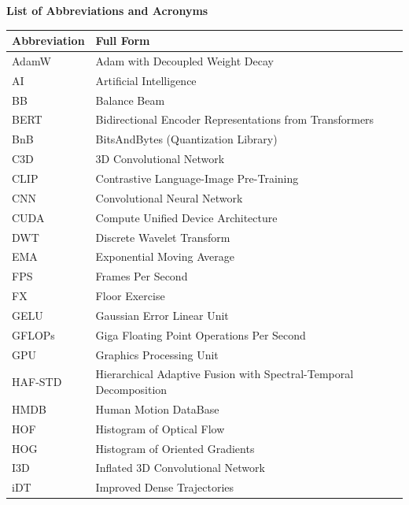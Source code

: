 
\newpage
{}
{}

\begin{center}
{\fontsize{16}{20}\selectfont \textbf{List of Abbreviations and Acronyms}}
\end{center}

\vspace{0.5cm}

\begin{longtable}{@{}p{3.5cm}p{10.5cm}@{}}
\toprule
\textbf{Abbreviation} & \textbf{Full Form} \\
\midrule
\endhead
AdamW & Adam with Decoupled Weight Decay \\
AI & Artificial Intelligence \\
BB & Balance Beam \\
BERT & Bidirectional Encoder Representations from Transformers \\
BnB & BitsAndBytes (Quantization Library) \\
C3D & 3D Convolutional Network \\
CLIP & Contrastive Language-Image Pre-Training \\
CNN & Convolutional Neural Network \\
CUDA & Compute Unified Device Architecture \\
DWT & Discrete Wavelet Transform \\
EMA & Exponential Moving Average \\
FPS & Frames Per Second \\
FX & Floor Exercise \\
GELU & Gaussian Error Linear Unit \\
GFLOPs & Giga Floating Point Operations Per Second \\
GPU & Graphics Processing Unit \\
HAF-STD & Hierarchical Adaptive Fusion with Spectral-Temporal Decomposition \\
HMDB & Human Motion DataBase \\
HOF & Histogram of Optical Flow \\
HOG & Histogram of Oriented Gradients \\
I3D & Inflated 3D Convolutional Network \\
iDT & Improved Dense Trajectories \\

\end{longtable}
